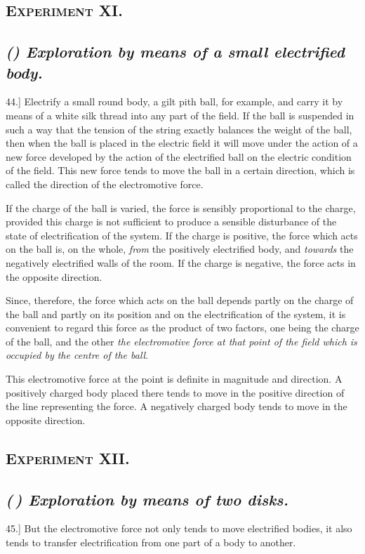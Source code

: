 \documentclass[12pt,oneside]{book}[2021/10/04]
\newcommand{\Heading}{\centering\normalfont}
\newcommand{\Section}[1]{\subsection*{\normalsize\Heading\scshape #1}}
\newcommand{\Subsection}[1]{\subsection*{\normalsize\Heading\itshape #1}}
\newcommand{\article}[1]{\phantomsection \label{art:#1}{#1.]}}
\newcommand{\¬}{\hphantom{0}}
\begin{document}
\Section{Experiment XI.}

\Subsection{\textup{(}\textup{)} Exploration by means of a small electrified body.}

\article{44} Electrify a small round body, a gilt pith ball, for example,
and carry it by means of a white silk thread into any part of the
field. If the ball is suspended in such a way that the tension of
the string exactly balances the weight of the ball, then when the
ball is placed in the electric field it will move under the action of a
new force developed by the action of the electrified ball on the
electric condition of the field. This new force tends to move the
ball in a certain direction, which is called the direction of the
electromotive force.

If the charge of the ball is varied, the force is sensibly proportional
to the charge, provided this charge is not sufficient to
produce a sensible disturbance of the state of electrification of the
system. If the charge is positive, the force which acts on the ball
is, on the whole, \textit{from} the positively electrified body, and \textit{towards}
the negatively electrified walls of the room. If the charge is
negative, the force acts in the opposite direction.

Since, therefore, the force which acts on the ball depends partly
on the charge of the ball and partly on its position and on the
electrification of the system, it is convenient to regard this force as
the product of two factors, one being the charge of the ball, and
the other \textit{the electromotive force at that point of the field which is
occupied by the centre of the ball}.

This electromotive force at the point is definite in magnitude
and direction. A positively charged body placed there tends to
move in the positive direction of the line representing the force. A
negatively charged body tends to move in the opposite direction.

\Section{Experiment XII.}

\Subsection{\textup{(}\,\textup{)} Exploration by means of two disks.}

\article{45} But the electromotive force not only tends to move electrified
bodies, it also tends to transfer electrification from one part
of a body to another.
\end{document}
